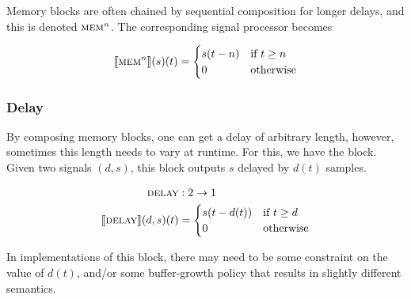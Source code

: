 Memory blocks are often chained by sequential composition for longer delays, and this is denoted
$\textsc{mem}^n$. The corresponding signal processor becomes

\[
  \llbracket \textsc{mem}^n \rrbracket(s)(t) =
  \begin{cases}
    s(t - n) & \text{if } t \geq n \\
    0        & \text{otherwise}
  \end{cases}
\]

\subsubsection{Delay}
\label{sec:block_delay}

By composing memory blocks, one can get a delay of arbitrary length, however, sometimes this length needs to
vary at runtime. For this, we have the \Delay block. Given two signals $(d, s)$, this block
outputs $s$ delayed by $d(t)$ samples.

\begin{align*}
  \textsc{delay}                 & : 2 \rightarrow 1            \\
  \llbracket \textsc{delay} \rrbracket(d, s)(t) & = \begin{cases}
    s(t - d(t)) & \text{if } t \geq d \\
    0           & \text{otherwise}
  \end{cases}
\end{align*}

In implementations of this block, there may need to be some constraint on the value of
$d(t)$, and/or some buffer-growth policy that results in slightly different semantics.
